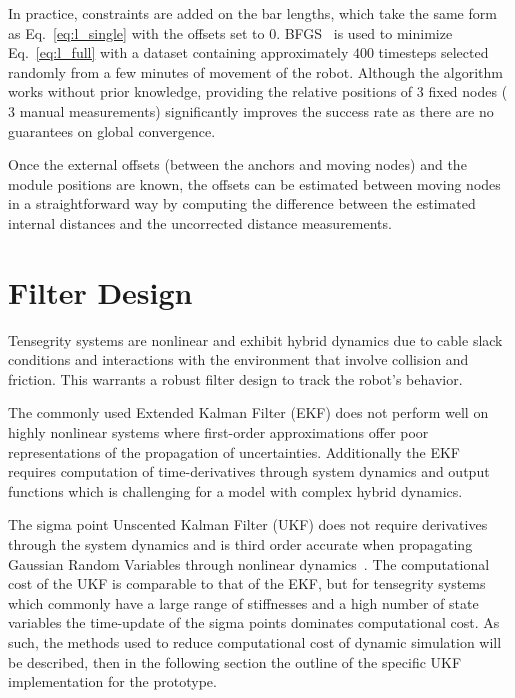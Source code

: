 {In practice, constraints are added on the bar lengths, which take the same form as Eq.~\ref{eq:l_single} with the offsets set to $0$.
BFGS~\cite{battiti1990bfgs} is used to minimize Eq.~\ref{eq:l_full} with  a dataset containing approximately $400$ timesteps selected randomly from a few minutes of movement of the robot.
Although the algorithm works without prior knowledge, providing the relative positions of $3$ fixed nodes ($3$ manual measurements) significantly improves the success rate as there are no guarantees on global convergence.

Once the external offsets (between the anchors and moving nodes) and the module positions are known, the offsets can be estimated between moving nodes in a straightforward way by computing the difference between the estimated internal distances and the uncorrected distance measurements.




\section{Filter Design}
\label{txt:ukf}

Tensegrity systems are nonlinear and exhibit hybrid dynamics due to cable slack conditions and  interactions with the environment that involve collision and friction. This warrants a robust filter design to track the robot's behavior.

The commonly used Extended Kalman Filter (EKF) does not perform well on highly nonlinear systems where first-order approximations offer poor representations of the propagation of uncertainties.
Additionally the EKF requires computation of time-derivatives through system dynamics and output functions which is challenging for a model with complex hybrid dynamics. 

The sigma point Unscented Kalman Filter (UKF) does not require derivatives through the system dynamics and is third order accurate when propagating Gaussian Random Variables through nonlinear dynamics~\cite{wan2000unscented}. The computational cost of the UKF is comparable to that of the EKF, but for tensegrity systems which commonly have a large range of stiffnesses and a high number of state variables the time-update of the sigma points dominates computational cost. As such, the methods used to reduce computational cost of dynamic simulation will be described, then in the following section the outline of the specific UKF implementation for the \SB{} prototype.

}
